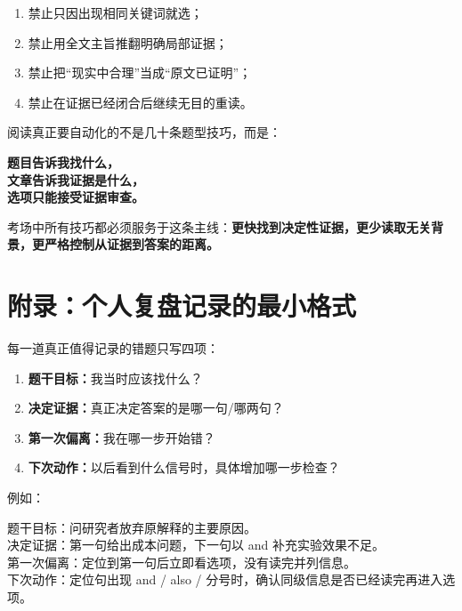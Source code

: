 \documentclass[11pt,a4paper]{ctexart}
\newcommand{\kw}[1]{\textbf{#1}}
\begin{document}
\begin{warn}[四个禁止]
\begin{enumerate}
  \item 禁止只因出现相同关键词就选；
  \item 禁止用全文主旨推翻明确局部证据；
  \item 禁止把“现实中合理”当成“原文已证明”；
  \item 禁止在证据已经闭合后继续无目的重读。
\end{enumerate}
\end{warn}

\begin{corebox}[最终心智模型]
阅读真正要自动化的不是几十条题型技巧，而是：
\begin{center}
\Large\bfseries
题目告诉我找什么，\\
文章告诉我证据是什么，\\
选项只能接受证据审查。
\end{center}
考场中所有技巧都必须服务于这条主线：\kw{更快找到决定性证据，更少读取无关背景，更严格控制从证据到答案的距离。}
\end{corebox}

\section{附录：个人复盘记录的最小格式}
每一道真正值得记录的错题只写四项：
\begin{enumerate}
  \item \kw{题干目标：}我当时应该找什么？
  \item \kw{决定证据：}真正决定答案的是哪一句/哪两句？
  \item \kw{第一次偏离：}我在哪一步开始错？
  \item \kw{下次动作：}以后看到什么信号时，具体增加哪一步检查？
\end{enumerate}

例如：
\begin{method}[复盘示例]
题干目标：问研究者放弃原解释的主要原因。\\
决定证据：第一句给出成本问题，下一句以 and 补充实验效果不足。\\
第一次偏离：定位到第一句后立即看选项，没有读完并列信息。\\
下次动作：定位句出现 and / also / 分号时，确认同级信息是否已经读完再进入选项。
\end{method}
\end{document}
